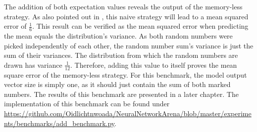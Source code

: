\documentclass[draft,final]{vutinfth} %
\begin{document}
    The addition of both expectation values reveals the output of the memory-less strategy.
    As also pointed out in \cite[p. 6]{UnitaryRNNs}, this naive strategy will lead to a mean squared error of $\frac{1}{6}$.
    This result can be verified as the mean squared error when predicting the mean equals the distribution's variance.
    As both random numbers were picked independently of each other, the random number sum's variance is just the sum of their variances.
    The distribution from which the random numbers are drawn has variance $\frac{1}{12}$.
    Therefore, adding this value to itself proves the mean square error of the memory-less strategy.
    For this benchmark, the model output vector size is simply one, as it should just contain the sum of both marked numbers.
    The results of this benchmark are presented in a later chapter.
    The implementation of this benchmark can be found under \url{https://github.com/Oidlichtnwoada/NeuralNetworkArena/blob/master/experiments/benchmarks/add_benchmark.py}.
\end{document}
